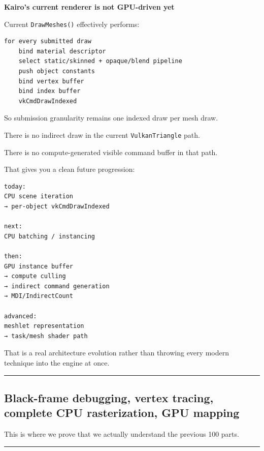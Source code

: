 \textbf{Kairo's current renderer is not GPU-driven yet}

Current \texttt{DrawMeshes()} effectively performs:

\begin{verbatim}
for every submitted draw
    bind material descriptor
    select static/skinned + opaque/blend pipeline
    push object constants
    bind vertex buffer
    bind index buffer
    vkCmdDrawIndexed
\end{verbatim}

So submission granularity remains one indexed draw per mesh draw.

There is no indirect draw in the current \texttt{VulkanTriangle} path.

There is no compute-generated visible command buffer in that path.

That gives you a clean future progression:

\begin{verbatim}
today:
CPU scene iteration
→ per-object vkCmdDrawIndexed

next:
CPU batching / instancing

then:
GPU instance buffer
→ compute culling
→ indirect command generation
→ MDI/IndirectCount

advanced:
meshlet representation
→ task/mesh shader path
\end{verbatim}

That is a real architecture evolution rather than throwing every modern technique into the engine at once.

\begin{center}\rule{0.5\linewidth}{0.5pt}\end{center}

\subsection{Black-frame debugging, vertex tracing, complete CPU rasterization, GPU mapping}\label{03-visual-computing-i-ch014-black-frame-debugging-vertex-tracing-complete-cpu-rasterization-gpu-mapping}

\hypertarget{03-visual-computing-i-ch014-black-frame-debugging-vertex-tracing-complete-cpu-rasterization-gpu-mapping}{}

This is where we prove that we actually understand the previous 100 parts.

\begin{center}\rule{0.5\linewidth}{0.5pt}\end{center}

